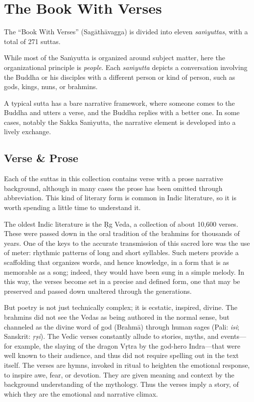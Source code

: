 \documentclass[12pt,openany]{book}%
\begin{document}
\section*{The Book With Verses}

The “Book With Verses” (\textsanskrit{Sagāthāvagga}) is divided into eleven \textit{\textsanskrit{saṁyuttas}}, with a total of 271 suttas.

While most of the \textsanskrit{Saṁyutta} is organized around subject matter, here the organizational principle is \emph{people}. Each \textit{\textsanskrit{saṁyutta}} depicts a conversation involving the Buddha or his disciples with a different person or kind of person, such as gods, kings, nuns, or brahmins.

A typical sutta has a bare narrative framework, where someone comes to the Buddha and utters a verse, and the Buddha replies with a better one. In some cases, notably the Sakka \textsanskrit{Saṁyutta}, the narrative element is developed into a lively exchange.

\subsection*{Verse \& Prose}

Each of the suttas in this collection contains verse with a prose narrative background, although in many cases the prose has been omitted through abbreviation. This kind of literary form is common in Indic literature, so it is worth spending a little time to understand it.

The oldest Indic literature is the Ṛg Veda, a collection of about 10,600 verses. These were passed down in the oral tradition of the brahmins for thousands of years. One of the keys to the accurate transmission of this sacred lore was the use of meter: rhythmic patterns of long and short syllables. Such meters provide a scaffolding that organizes words, and hence knowledge, in a form that is as memorable as a song; indeed, they would have been sung in a simple melody. In this way, the verses become set in a precise and defined form, one that may be preserved and passed down unaltered through the generations.

But poetry is not just technically complex; it is ecstatic, inspired, divine. The brahmins did not see the Vedas as being authored in the normal sense, but channeled as the divine word of god (\textsanskrit{Brahmā}) through human sages (Pali: \textit{isi}; Sanskrit: \textit{\textsanskrit{ṛṣi}}). The Vedic verses constantly allude to stories, myths, and events—for example, the slaying of the dragon \textsanskrit{Vṛtra} by the god-hero Indra—that were well known to their audience, and thus did not require spelling out in the text itself. The verses are hymns, invoked in ritual to heighten the emotional response, to inspire awe, fear, or devotion. They are given meaning and context by the background understanding of the mythology. Thus the verses imply a story, of which they are the emotional and narrative climax.
\end{document}
